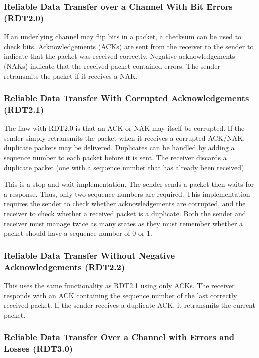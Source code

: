 \subsubsection[RDT over a Channel With Bit Errors (RDT2.0)]{Reliable Data Transfer over a Channel With Bit Errors (RDT2.0)}

If an underlying channel may flip bits in a packet, a checksum can be used to check bits.
Acknowledgements (ACKs) are sent from the receiver to the sender to indicate that the packet was received correctly.
Negative acknowledgements (NAKs) indicate that the received packet contained errors.
The sender retransmits the packet if it receives a NAK.

\subsubsection[RDT With Corrupted Acknowledgements (RDT2.1)]{Reliable Data Transfer With Corrupted Acknowledgements (RDT2.1)}

The flaw with RDT2.0 is that an ACK or NAK may itself be corrupted.
If the sender simply retransmits the packet when it receives a corrupted ACK/NAK, duplicate packets may be delivered.
Duplicates can be handled by adding a sequence number to each packet before it is sent.
The receiver discards a duplicate packet (one with a sequence number that has already been received).

This is a stop-and-wait implementation.
The sender sends a packet then waits for a response.
Thus, only two sequence numbers are required.
This implementation requires the sender to check whether acknowledgements are corrupted, and the receiver to check whether a received packet is a duplicate.
Both the sender and receiver must manage twice as many states as they must remember whether a packet should have a sequence number of \num{0} or \num{1}.

\subsubsection[RDT Without Negative Acknowledgements (RDT2.2)]{Reliable Data Transfer Without Negative Acknowledgements (RDT2.2)}

This uses the same functionality as RDT2.1 using only ACKs.
The receiver responds with an ACK containing the sequence number of the last correctly received packet.
If the sender receives a duplicate ACK, it retransmits the current packet.

\subsubsection[RDT Over a Channel with Errors and Losses (RDT3.0)]{Reliable Data Transfer Over a Channel with Errors and Losses (RDT3.0)}

